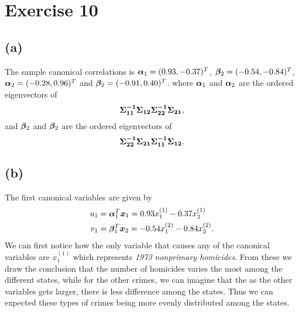 
\section*{Exercise 10}
\label{sec:exercise-10}

\subsection*{(a)}
\label{sec:a-6}

The sample canonical correlations is $\bm{\alpha}_1  = (0.93, -0.37  )^T$,
$\bm{\beta}_2 = (-0.54, -0.84 )^T$, $\bm{\alpha}_2 = (-0.28,  0.96 )^T$ and $\bm{\beta}_2 = (-0.91,0.40)^T$. where $\bm{\alpha}_1$ and $\bm{\alpha}_2$ are the
ordered eigenvectors of 
\begin{equation*}
  \bm{\Sigma^{-1}_{11}\Sigma_{12}\Sigma_{22}^{-1}\Sigma_{21}}, 
\end{equation*}
and $\bm{\beta}_2$ and $\bm{\beta}_2$ are  the ordered eigenvectors of 
\begin{equation*}
  \bm{\Sigma^{-1}_{22}\Sigma_{21}\Sigma_{11}^{-1}\Sigma_{12}}.
\end{equation*}

\subsection*{(b)}
\label{sec:b-9}

The first canonical variables are given by
\begin{align*}
  u_1 &= \bm{\alpha}_1^T \bm{x}_1= 0.93 x_1^{(1)} - 0.37 x_2^{(1)} \\
  v_1 &= \bm{\beta}_1^T \bm{x}_2 = -0.54 x_1^{(2)} - 0.84 x_2^{(2)}.
\end{align*}
We can first notice how the only variable that causes any of the
canonical variables are $x_1^{(1)}$ which represents \textit{1973
  nonprimary homicides}. From these we draw the conclusion that the
number of homicides varies the most among the different states, while
for the other crimes, we can imagine that the as the other variables
gets larger, there is less difference among the states. Thus we can
expected these types of crimes being more evenly distributed among the states.


